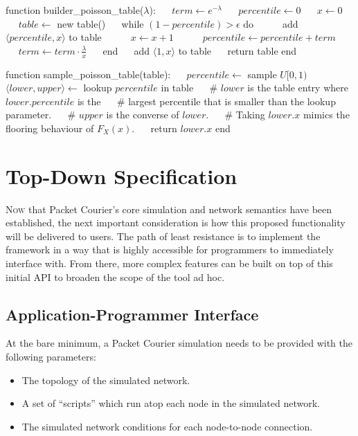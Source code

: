 \newpage

\begin{algorithm}[caption={Poisson distribution builder and sampler.},label={alg:poisson_builder_and_sampler},
    captionpos=b]
    function builder_poisson_table($\lambda$):
    $\quad$ $term \gets e^{-\lambda}$
    $\quad$ $percentile \gets 0$
    $\quad$ $x \gets 0$
    $\quad$ $table \gets$ new table()
    $\quad$ while $(1 - percentile) > \epsilon$ do
    $\quad$ $\quad$ add $\langle percentile, x \rangle$ to table
    $\quad$ $\quad$ $x \gets x + 1$
    $\quad$ $\quad$ $percentile \gets percentile + term$
    $\quad$ $\quad$ $term \gets term \cdot \frac{\lambda}{x}$
    $\quad$ end
    $\quad$ add  $\langle 1, x \rangle$ to table
    $\quad$ return table
    end

    function sample_poisson_table(table):
    $\quad$ $percentile \gets$ sample $U[0, 1)$
    $\quad$ $\langle lower, upper \rangle \gets$ lookup $percentile$ in table
    $\quad$ # $lower$ is the table entry where $lower.percentile$ is the
    $\quad$ # largest percentile that is smaller than the lookup parameter.
    $\quad$ # $upper$ is the converse of $lower$.
    $\quad$ # Taking $lower.x$ mimics the flooring behaviour of $F_X(x)$.
    $\quad$ return $lower.x$
    end
\end{algorithm}


\section{Top-Down Specification}\label{section:top_down_specification}

\lettrine{N}{ow} that Packet Courier's core simulation and network semantics have been established, the next
important consideration is how this proposed functionality will be delivered to users. The path of least resistance
is to implement the framework in a way that is highly accessible for programmers to immediately interface with. From
there, more complex features can be built on top of this initial API to broaden the scope of the tool ad hoc.

\subsection{Application-Programmer Interface}\label{subsection:application_programmer_interface}

At the bare minimum, a Packet Courier simulation needs to be provided with the following parameters:
\begin{itemize}
    \item The topology of the simulated network.
    \item A set of ``scripts'' which run atop each node in the simulated network.
    \item The simulated network conditions for each node-to-node connection.
\end{itemize}

